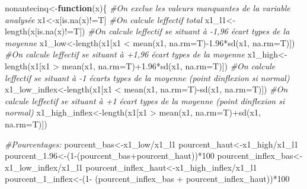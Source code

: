 \documentclass[
]{book}
\newenvironment{Shaded}{\begin{snugshade}}{\end{snugshade}}
\newcommand{\AttributeTok}[1]{\textcolor[rgb]{0.77,0.63,0.00}{#1}}
\newcommand{\CommentTok}[1]{\textcolor[rgb]{0.56,0.35,0.01}{\textit{#1}}}
\newcommand{\ControlFlowTok}[1]{\textcolor[rgb]{0.13,0.29,0.53}{\textbf{#1}}}
\newcommand{\DecValTok}[1]{\textcolor[rgb]{0.00,0.00,0.81}{#1}}
\newcommand{\FloatTok}[1]{\textcolor[rgb]{0.00,0.00,0.81}{#1}}
\newcommand{\FunctionTok}[1]{\textcolor[rgb]{0.00,0.00,0.00}{#1}}
\newcommand{\NormalTok}[1]{#1}
\newcommand{\OtherTok}[1]{\textcolor[rgb]{0.56,0.35,0.01}{#1}}
\newcommand{\SpecialCharTok}[1]{\textcolor[rgb]{0.00,0.00,0.00}{#1}}
\begin{document}
\begin{Shaded}
\begin{Highlighting}[]
\NormalTok{nonantecinq}\OtherTok{\textless{}{-}}\ControlFlowTok{function}\NormalTok{(x)\{}
  \CommentTok{\#On exclue les valeurs manquantes de la variable analysée}
\NormalTok{  x1}\OtherTok{\textless{}{-}}\NormalTok{x[}\FunctionTok{is.na}\NormalTok{(x)}\SpecialCharTok{!=}\NormalTok{T]}
  \CommentTok{\#On calcule l\textquotesingle{}effectif total}
\NormalTok{  x1\_l1}\OtherTok{\textless{}{-}}\FunctionTok{length}\NormalTok{(x[}\FunctionTok{is.na}\NormalTok{(x)}\SpecialCharTok{!=}\NormalTok{T])}
  \CommentTok{\#On calcule l\textquotesingle{}effectif se situant à {-}1,96 écart types de la moyenne}
\NormalTok{  x1\_low}\OtherTok{\textless{}{-}}\FunctionTok{length}\NormalTok{(x1[x1 }\SpecialCharTok{\textless{}} \FunctionTok{mean}\NormalTok{(x1, }\AttributeTok{na.rm=}\NormalTok{T)}\SpecialCharTok{{-}}\FloatTok{1.96}\SpecialCharTok{*}\FunctionTok{sd}\NormalTok{(x1, }\AttributeTok{na.rm=}\NormalTok{T)])}
  \CommentTok{\#On calcule l\textquotesingle{}effectif se situant à +1,96 écart types de la moyenne}
\NormalTok{  x1\_high}\OtherTok{\textless{}{-}}\FunctionTok{length}\NormalTok{(x1[x1 }\SpecialCharTok{\textgreater{}} \FunctionTok{mean}\NormalTok{(x1, }\AttributeTok{na.rm=}\NormalTok{T)}\SpecialCharTok{+}\FloatTok{1.96}\SpecialCharTok{*}\FunctionTok{sd}\NormalTok{(x1, }\AttributeTok{na.rm=}\NormalTok{T)])}
  \CommentTok{\#On calcule l\textquotesingle{}effectif se situant à {-}1 écarts types de la moyenne (point d\textquotesingle{}inflexion si normal)}
\NormalTok{  x1\_low\_inflex}\OtherTok{\textless{}{-}}\FunctionTok{length}\NormalTok{(x1[x1 }\SpecialCharTok{\textless{}} \FunctionTok{mean}\NormalTok{(x1, }\AttributeTok{na.rm=}\NormalTok{T)}\SpecialCharTok{{-}}\FunctionTok{sd}\NormalTok{(x1, }\AttributeTok{na.rm=}\NormalTok{T)])}
  \CommentTok{\#On calcule l\textquotesingle{}effectif se situant à +1 écart types de la moyenne (point d\textquotesingle{}inflexion si normal)}
\NormalTok{  x1\_high\_inflex}\OtherTok{\textless{}{-}}\FunctionTok{length}\NormalTok{(x1[x1 }\SpecialCharTok{\textgreater{}} \FunctionTok{mean}\NormalTok{(x1, }\AttributeTok{na.rm=}\NormalTok{T)}\SpecialCharTok{+}\FunctionTok{sd}\NormalTok{(x1, }\AttributeTok{na.rm=}\NormalTok{T)])}
  
  \CommentTok{\#Pourcentages:}
\NormalTok{  pourcent\_bas}\OtherTok{\textless{}{-}}\NormalTok{x1\_low}\SpecialCharTok{/}\NormalTok{x1\_l1}
\NormalTok{  pourcent\_haut}\OtherTok{\textless{}{-}}\NormalTok{x1\_high}\SpecialCharTok{/}\NormalTok{x1\_l1}
\NormalTok{  pourcent\_1}\FloatTok{.96}\OtherTok{\textless{}{-}}\NormalTok{(}\DecValTok{1}\SpecialCharTok{{-}}\NormalTok{(pourcent\_bas}\SpecialCharTok{+}\NormalTok{pourcent\_haut))}\SpecialCharTok{*}\DecValTok{100}
\NormalTok{  pourcent\_inflex\_bas}\OtherTok{\textless{}{-}}\NormalTok{x1\_low\_inflex}\SpecialCharTok{/}\NormalTok{x1\_l1}
\NormalTok{  pourcent\_inflex\_haut}\OtherTok{\textless{}{-}}\NormalTok{x1\_high\_inflex}\SpecialCharTok{/}\NormalTok{x1\_l1}
\NormalTok{  pourcent\_1\_inflex}\OtherTok{\textless{}{-}}\NormalTok{(}\DecValTok{1}\SpecialCharTok{{-}}\NormalTok{ (pourcent\_inflex\_bas }\SpecialCharTok{+}\NormalTok{ pourcent\_inflex\_haut))}\SpecialCharTok{*}\DecValTok{100}
  

\end{Highlighting}
\end{Shaded}
\end{document}
